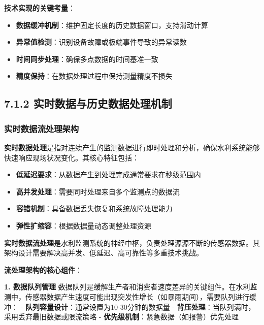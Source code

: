 \textbf{技术实现的关键考量}：

\begin{itemize}
\tightlist
\item
  \textbf{数据缓冲机制}：维护固定长度的历史数据窗口，支持滑动计算
\item
  \textbf{异常值检测}：识别设备故障或极端事件导致的异常读数
\item
  \textbf{时间同步处理}：确保多点数据的时间基准一致
\item
  \textbf{精度保持}：在数据处理过程中保持测量精度不损失
\end{itemize}

\subsection{7.1.2 实时数据与历史数据处理机制}\label{ux5b9eux65f6ux6570ux636eux4e0eux5386ux53f2ux6570ux636eux5904ux7406ux673aux5236}

\subsubsection{实时数据流处理架构}\label{ux5b9eux65f6ux6570ux636eux6d41ux5904ux7406ux67b6ux6784}

\textbf{实时数据处理}是指对连续产生的监测数据进行即时处理和分析，确保水利系统能够快速响应现场状况变化。其核心特征包括：

\begin{itemize}
\tightlist
\item
  \textbf{低延迟要求}：从数据产生到处理完成通常要求在秒级范围内
\item
  \textbf{高并发处理}：需要同时处理来自多个监测点的数据流
\item
  \textbf{容错机制}：具备数据丢失恢复和系统故障处理能力
\item
  \textbf{弹性扩缩容}：根据数据量动态调整处理资源
\end{itemize}

\textbf{实时数据流处理}是水利监测系统的神经中枢，负责处理源源不断的传感器数据。其架构设计需要解决高并发、低延迟、高可靠性等多重技术挑战。

\textbf{流处理架构的核心组件}：

\textbf{1. 数据队列管理} 数据队列是缓解生产者和消费者速度差异的关键组件。在水利监测中，传感器数据产生速度可能出现突发性增长（如暴雨期间），需要队列进行缓冲： - \textbf{队列容量设计}：通常设置为10-30分钟的数据量 - \textbf{背压处理}：当队列满时，采用丢弃最旧数据或限流策略 - \textbf{优先级机制}：紧急数据（如报警）优先处理

